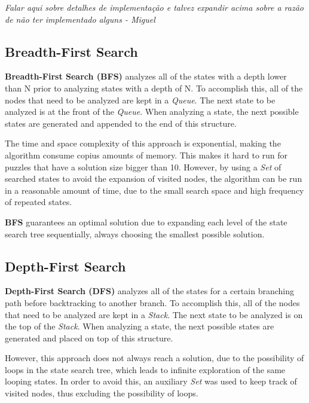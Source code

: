\documentclass[conference]{IEEEtran}
\begin{document}
\begin{bf}
\textit{
Falar aqui sobre detalhes de implementação e talvez expandir acima sobre a razão de não ter implementado alguns - Miguel
}
\end{bf}

\subsection{Breadth-First Search}

\textbf{Breadth-First Search (BFS)} analyzes all of the states with a depth lower than N prior to analyzing states with a depth of N. To accomplish this, all of the nodes that need to be analyzed are kept in a \textit{Queue}. The next state to be analyzed is at the front of the \textit{Queue}. When analyzing a state, the next possible states are generated and appended to the end of this structure.

The time and space complexity of this approach is exponential, making the algorithm consume copius amounts of memory. This makes it hard to run for puzzles that have a solution size bigger than 10. However, by using a \textit{Set} of searched states to avoid the expansion of visited nodes, the algorithm can be run in a reasonable amount of time, due to the small search space and high frequency of repeated states.

\textbf{BFS} guarantees an optimal solution due to expanding each level of the state search tree sequentially, always choosing the smallest possible solution.

\subsection{Depth-First Search}

\textbf{Depth-First Search (DFS)} analyzes all of the states for a certain branching path before backtracking to another branch. To accomplish this, all of the nodes that need to be analyzed are kept in a \textit{Stack}. The next state to be analyzed is on the top of the \textit{Stack}. When analyzing a state, the next possible states are generated and placed on top of this structure.

However, this approach does not always reach a solution, due to the possibility of loops in the state search tree, which leads to infinite exploration of the same looping states.
In order to avoid this, an auxiliary \textit{Set} was used to keep track of visited nodes, thus excluding the possibility of loops.
\end{document}
